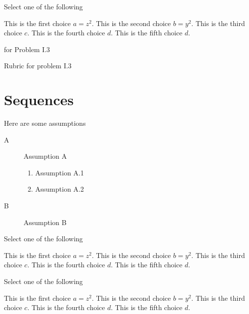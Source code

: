 \begin{mproblem}
\begin{problem}[40][Problem I.3]
\label{quiz-ii:2}
Select one of the following
\begin{xchoice}
\choice This is the first choice $a = z^2$.
\choice This is the second choice $b = y^2$.
\choice* This is the third choice $c$.
\choice* This is the fourth choice $d$.
\choice This is the fifth choice $d$.
\end{xchoice}

\help  for Problem I.3

\rubric
Rubric for problem I.3
\end{problem}

\end{mproblem}

\section[50]{Sequences}
\label{sec:quiz-ii::middle}

\begin{gram}
Here are some assumptions
\begin{description}
\item[A] Assumption A
\begin{enumerate}
\item Assumption A.1
\item Assumption A.2
\end{enumerate}

\item[B] Assumption B
\end{description}
\end{gram}


\begin{problem}[70][Xchoice I]
Select one of the following
\begin{xchoice}
\choice This is the first choice $a = z^2$.
\choice This is the second choice $b = y^2$.
\choice* This is the third choice $c$.
\choice* This is the fourth choice $d$.
\choice This is the fifth choice $d$.
\end{xchoice}
\end{problem}

\begin{problem}[80][Xchoice I.2]
Select one of the following
\begin{xchoice}
\choice This is the first choice $a = z^2$.
\choice This is the second choice $b = y^2$.
\choice* This is the third choice $c$.
\choice* This is the fourth choice $d$.
\choice This is the fifth choice $d$.
\end{xchoice}
\end{problem}


